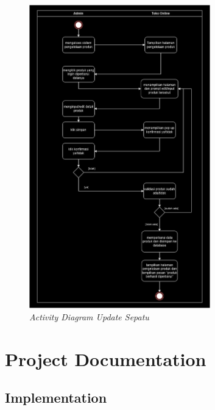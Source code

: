 \documentclass[journal,article,submit,pdftex,moreauthors]{Definitions/mdpi}
\begin{document}
\begin{figure}[H]
    \centering
    \includegraphics[width=0.7\textwidth]{images/activityupdatesepatudiagram.png}
    \captionsetup{justification=centering}
    \caption{\textit{Activity Diagram Update Sepatu}}
    \label{fig:activity-admin}
\end{figure}

\section{Project Documentation}

\subsection{Implementation}
\end{document}
